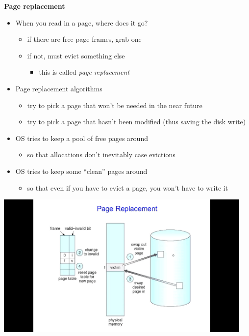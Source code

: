 \documentclass[11pt,a4paper]{article}
\begin{document}
\textbf{Page replacement}
\begin{itemize}
    \item When you read in a page, where does it go?
        \begin{itemize}
            \item if there are free page frames, grab one
            \item if not, must evict something else
                \begin{itemize}
                    \item this is called \emph{page replacement}
                \end{itemize}
        \end{itemize}
    \item Page replacement algorithms
        \begin{itemize}
            \item try to pick a page that won't be needed in the near future
            \item try to pick a page that hasn't been modified (thus saving the disk write)
        \end{itemize}
    \item OS tries to keep a pool of free pages around
        \begin{itemize}
            \item so that allocations don't inevitably case evictions
        \end{itemize}
    \item OS tries to keep some ``clean'' pages around
        \begin{itemize}
            \item so that even if you have to evict a page, you won't have to write it
        \end{itemize}
\end{itemize}

\includegraphics[height=270]{page-replacement.jpg}
\end{document}
